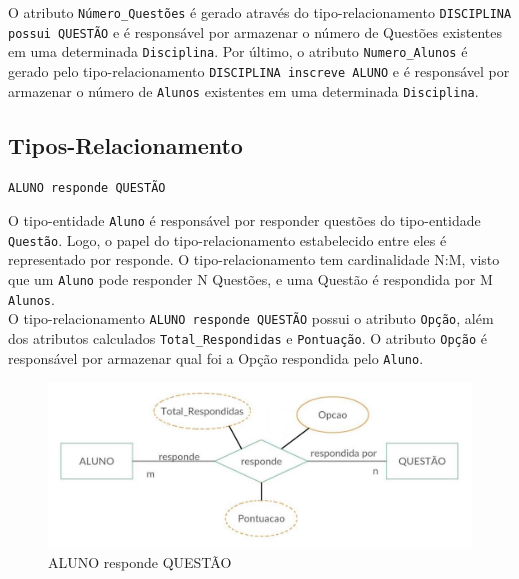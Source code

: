 \documentclass[12pt,a4paper]{article}
\begin{document}
O atributo \texttt{Número\_Questões} é gerado através do tipo-relacionamento \texttt{DISCIPLINA possui QUESTÃO} e é responsável por armazenar o número de Questões existentes em uma determinada \texttt{Disciplina}. Por último, o atributo \texttt{Numero\_Alunos} é gerado pelo tipo-relacionamento \texttt{DISCIPLINA inscreve ALUNO} e é responsável por armazenar o número de \texttt{Alunos} existentes em uma determinada \texttt{Disciplina}.\\

\subsection{Tipos-Relacionamento}

\vspace{0.5cm}
\begin{center}
    \texttt{{ALUNO \texttt{responde} QUESTÃO}}
\end{center}

O tipo-entidade {\texttt{Aluno}} é responsável por responder questões do tipo-entidade \texttt{Questão}. Logo, o papel do tipo-relacionamento estabelecido entre eles é representado por responde. O tipo-relacionamento tem cardinalidade N:M, visto que um \texttt{Aluno} pode responder N Questões, e uma Questão é respondida por M \texttt{Alunos}.\\

O tipo-relacionamento \texttt{{ALUNO responde QUESTÃO}} possui o atributo \texttt{Opção}, além dos atributos calculados \texttt{Total\_Respondidas} e \texttt{Pontuação}. O atributo \texttt{Opção} é responsável por armazenar qual foi a Opção respondida pelo \texttt{Aluno}.

\begin{center}
\centering
\begin{figure}[h]
    \centering
    \includegraphics[width=\linewidth]{alunoQuestao.jpg}
    \caption{ALUNO responde QUESTÃO}
    \label{fig:alunoQuestao}
\end{figure}
\end{center}
\end{document}
